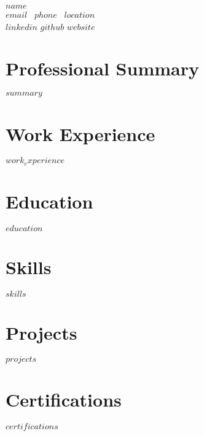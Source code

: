 \documentclass[11pt,a4paper]{article}
\begin{document}
\begin{center}
  {\Huge\bfseries\color{primary} $name$}\\[4pt]
  {\color{primary}$email$ \textbar\ $phone$ \textbar\ $location$}\\[2pt]
  {\color{primary}$linkedin$ $github$ $website$}
\end{center}

\vspace{6pt}
\section*{Professional Summary}
$summary$

\section*{Work Experience}
$work_experience$

\section*{Education}
$education$

\section*{Skills}
$skills$

\section*{Projects}
$projects$

\section*{Certifications}
$certifications$
\end{document}
